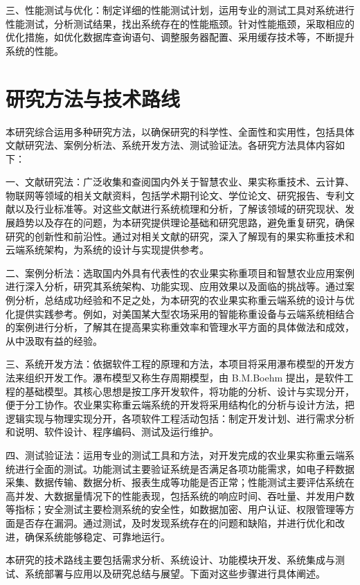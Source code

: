 \documentclass{xduugthesis}
\begin{document}
三、性能测试与优化：制定详细的性能测试计划，运用专业的测试工具对系统进行性能测试，分析测试结果，找出系统存在的性能瓶颈。针对性能瓶颈，采取相应的优化措施，如优化数据库查询语句、调整服务器配置、采用缓存技术等，不断提升系统的性能。

\section{研究方法与技术路线}

本研究综合运用多种研究方法，以确保研究的科学性、全面性和实用性，包括具体文献研究法、案例分析法、系统开发方法、测试验证法。各研究方法具体内容如下：

一、文献研究法：广泛收集和查阅国内外关于智慧农业、果实称重技术、云计算、物联网等领域的相关文献资料，包括学术期刊论文、学位论文、研究报告、专利文献以及行业标准等。对这些文献进行系统梳理和分析，了解该领域的研究现状、发展趋势以及存在的问题，为本研究提供理论基础和研究思路，避免重复研究，确保研究的创新性和前沿性。通过对相关文献的研究，深入了解现有的果实称重技术和云端系统架构，为系统的设计与实现提供参考。

二、案例分析法：选取国内外具有代表性的农业果实称重项目和智慧农业应用案例进行深入分析，研究其系统架构、功能实现、应用效果以及面临的挑战等。通过案例分析，总结成功经验和不足之处，为本研究的农业果实称重云端系统的设计与优化提供实践参考。例如，对美国某大型农场采用的智能称重设备与云端系统相结合的案例\cite{Anisha2019FruitRU}进行分析，了解其在提高果实称重效率和管理水平方面的具体做法和成效，从中汲取有益的经验。

三、系统开发方法：依据软件工程的原理和方法，本项目将采用瀑布模型的开发方法来组织开发工作。瀑布模型又称生存周期模型，由 B.M.Boehm 提出，是软件工程的基础模型。其核心思想是按工序开发软件，将功能的分析、设计与实现分开，便于分工协作\cite{叶俊民2006软件工程}。农业果实称重云端系统的开发将采用结构化的分析与设计方法，把逻辑实现与物理实现分开，各项软件工程活动包括：制定开发计划、进行需求分析和说明、软件设计、程序编码、测试及运行维护。

四、测试验证法：运用专业的测试工具和方法，对开发完成的农业果实称重云端系统进行全面的测试。功能测试主要验证系统是否满足各项功能需求，如电子秤数据采集、数据传输、数据分析、报表生成等功能是否正常；性能测试主要评估系统在高并发、大数据量情况下的性能表现，包括系统的响应时间、吞吐量、并发用户数等指标；安全测试主要检测系统的安全性，如数据加密、用户认证、权限管理等方面是否存在漏洞。通过测试，及时发现系统存在的问题和缺陷，并进行优化和改进，确保系统能够稳定、可靠地运行。

本研究的技术路线主要包括需求分析、系统设计、功能模块开发、系统集成与测试、系统部署与应用以及研究总结与展望。下面对这些步骤进行具体阐述。
\end{document}
